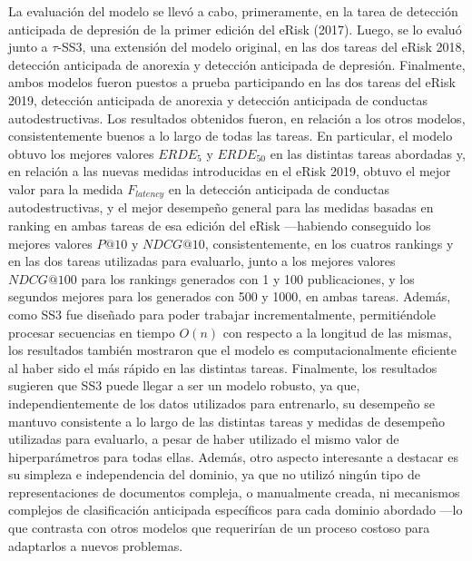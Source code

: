 La evaluación del modelo se llevó a cabo, primeramente, en la tarea de detección anticipada de depresión de la primer edición del eRisk (2017).
Luego, se lo evaluó junto a $\tau$-SS3, una extensión del modelo original, en las dos tareas del eRisk 2018, detección anticipada de anorexia y detección anticipada de depresión. Finalmente, ambos modelos fueron puestos a prueba participando en las dos tareas del eRisk 2019, detección anticipada de anorexia y detección anticipada de conductas autodestructivas.
Los resultados obtenidos fueron, en relación a los otros modelos, consistentemente buenos a lo largo de todas las tareas.
En particular, el modelo obtuvo los mejores valores $ERDE_5$ y $ERDE_{50}$ en las distintas tareas abordadas y, en relación a las nuevas medidas introducidas en el eRisk 2019, obtuvo el mejor valor para la medida $F_{latency}$ en la detección anticipada de conductas autodestructivas, y el mejor desempeño general para las medidas basadas en ranking en ambas tareas de esa edición del eRisk ---habiendo conseguido los mejores valores $P@10$ y  $NDCG@10$, consistentemente, en los cuatros rankings y en las dos tareas utilizadas para evaluarlo, junto a los mejores valores $NDCG@100$ para los rankings generados con 1 y 100 publicaciones, y los segundos mejores para los generados con 500 y 1000, en ambas tareas.
Además, como SS3 fue diseñado para poder trabajar incrementalmente, permitiéndole procesar secuencias en tiempo $O(n)$ con respecto a la longitud de las mismas, los resultados también mostraron que el modelo es computacionalmente eficiente al haber sido el más rápido en las distintas tareas.
Finalmente, los resultados sugieren que SS3 puede llegar a ser un modelo robusto, ya que, independientemente de los datos utilizados para entrenarlo, su desempeño se mantuvo consistente a lo largo de las distintas tareas y medidas de desempeño utilizadas para evaluarlo, a pesar de haber utilizado el mismo valor de hiperparámetros para todas ellas.
Además, otro aspecto interesante a destacar es su simpleza e independencia del dominio, ya que no utilizó ningún tipo de representaciones de documentos compleja, o manualmente creada, ni mecanismos complejos de clasificación anticipada específicos para cada dominio abordado ---lo que contrasta con otros modelos que requerirían de un proceso costoso para adaptarlos a nuevos problemas.

